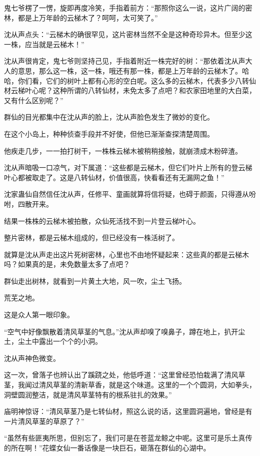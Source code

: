 \begin{this_body}
鬼七爷楞了一愣，旋即再度冷笑，手指着前方：“那照你这么一说，这片广阔的密林，都是上万年龄的云梯木了？呵呵，太可笑了。”

沈从声点头：“云梯木的确很罕见，这片密林当然不全是这种奇珍异木。但至少这一株，应当就是云梯木！”

沈从声很肯定，鬼七爷则坚持己见，手指着附近一株完好的树：“那依着沈从声大人的意思，那么这一株，这一株，哦还有那一株，都是上万年龄的云梯木了。哈哈，你们看，它们的树叶上都有心形的空白呢。这么多的云梯木，代表多少八转仙材云梯叶心呢？这种所谓的八转仙材，未免太多了点吧？和农家田地里的大白菜，又有什么区别呢？”

群仙的目光都集中在沈从声的脸上，沈从声脸色发生了微妙的变化。

在这个小岛上，种种侦查手段并不好使，但他已渐渐查探清楚周围。

他疾走几步，一一拍打树干，一株株云梯木被稍稍接触，就崩溃成木粉碎渣。

沈从声暗吸一口凉气，对下属道：“这些都是云梯木，但它们叶片上所有的登云梯叶心都被取走了。这是八转仙材，价值很高，快看看还有无漏网之鱼！”

沈家蛊仙自然信任沈从声，任修平、童画就算将信将疑，也碍于颜面，只得遵从吩咐，四散开来。

结果一株株的云梯木被拍散，众仙死活找不到一片登云梯叶心。

整片密林，都是云梯木组成的，但已经没有一株活树了。

就算是沈从声走出这片死树密林，心里也不由地怀疑起来：这些真的都是云梯木吗？如果真的是，未免数量太多了点吧？

群仙走出树林，就看到一片黄土大地，风一吹，尘土飞扬。

荒芜之地。

这是众人第一眼印象。

“空气中好像飘散着清风草茎的气息。”沈从声却嗅了嗅鼻子，蹲在地上，扒开尘土，尘土中露出一个个的小洞。

沈从声神色微变。

这一次，曾落子也辨认出了蹊跷之处，他低呼道：“这里曾经恐怕栽满了清风草茎，我闻过清风草茎的清新草香，就是这个味道。这里的一个个圆洞，大如拳头，洞壁圆润整洁，就是清风草茎特有的根系驻扎的效果。”

庙明神惊讶：“清风草茎乃是七转仙材，照这么说的话，这里圆洞遍地，曾经是有一片清风草茎的草原了？”

“虽然有些匪夷所思，但别忘了，我们可是在苍蓝龙鲸之中呢。这里可是乐土真传的所在啊！”花蝶女仙一番话像是一块巨石，砸落在群仙的心湖中。


\end{this_body}
